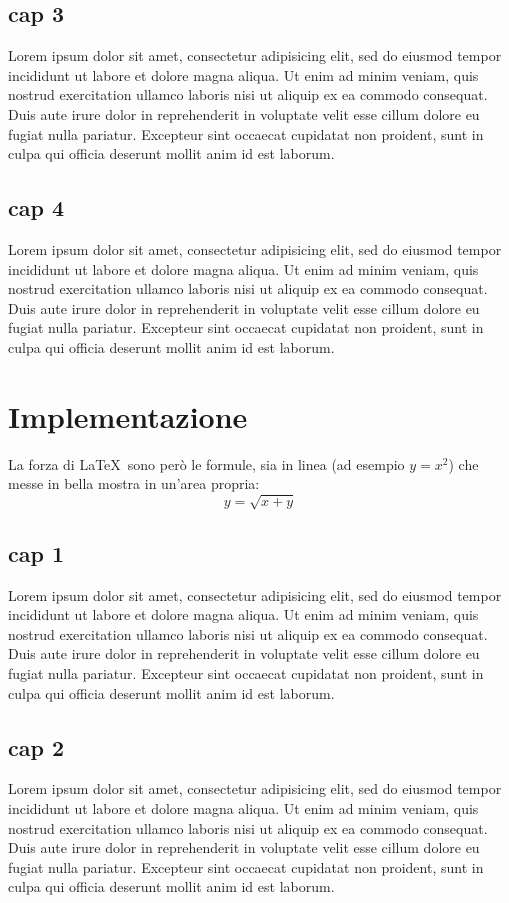 \documentclass[a4paper,10pt]{report} %
\begin{document}
  \chapter{cap 3}
    Lorem ipsum dolor sit amet, consectetur adipisicing elit, sed do eiusmod tempor incididunt ut labore et dolore magna aliqua. Ut enim ad minim veniam, quis nostrud exercitation ullamco laboris nisi ut aliquip ex ea commodo consequat. Duis aute irure dolor in reprehenderit in voluptate velit esse cillum dolore eu fugiat nulla pariatur. Excepteur sint occaecat cupidatat non proident, sunt in culpa qui officia deserunt mollit anim id est laborum.
  \chapter{cap 4}
    Lorem ipsum dolor sit amet, consectetur adipisicing elit, sed do eiusmod tempor incididunt ut labore et dolore magna aliqua. Ut enim ad minim veniam, quis nostrud exercitation ullamco laboris nisi ut aliquip ex ea commodo consequat. Duis aute irure dolor in reprehenderit in voluptate velit esse cillum dolore eu fugiat nulla pariatur. Excepteur sint occaecat cupidatat non proident, sunt in culpa qui officia deserunt mollit anim id est laborum.
\newpage
\part{Implementazione} %
  La forza di \LaTeX\ sono però le formule, sia in linea (ad esempio \(y=x^2\))
   che messe in bella mostra in un'area propria:
  \[y=\sqrt{x+y}\]
  \chapter{cap 1}
    Lorem ipsum dolor sit amet, consectetur adipisicing elit, sed do eiusmod tempor incididunt ut labore et dolore magna aliqua. Ut enim ad minim veniam, quis nostrud exercitation ullamco laboris nisi ut aliquip ex ea commodo consequat. Duis aute irure dolor in reprehenderit in voluptate velit esse cillum dolore eu fugiat nulla pariatur. Excepteur sint occaecat cupidatat non proident, sunt in culpa qui officia deserunt mollit anim id est laborum.
  \chapter{cap 2}
    Lorem ipsum dolor sit amet, consectetur adipisicing elit, sed do eiusmod tempor incididunt ut labore et dolore magna aliqua. Ut enim ad minim veniam, quis nostrud exercitation ullamco laboris nisi ut aliquip ex ea commodo consequat. Duis aute irure dolor in reprehenderit in voluptate velit esse cillum dolore eu fugiat nulla pariatur. Excepteur sint occaecat cupidatat non proident, sunt in culpa qui officia deserunt mollit anim id est laborum.
\end{document}
